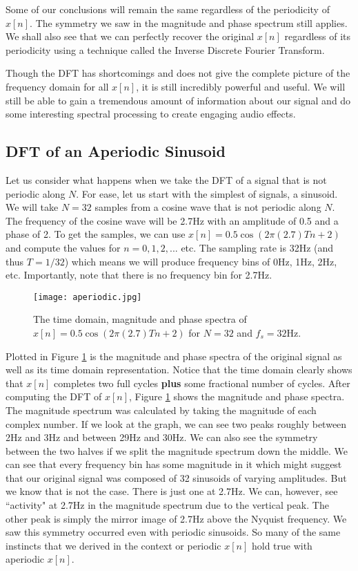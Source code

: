 Some of our conclusions will remain the same regardless of the periodicity of $x[n]$.  The symmetry we saw 
in the magnitude and phase spectrum still applies.  We shall also see that we can perfectly recover the 
original $x[n]$ regardless
of its periodicity using a technique called the Inverse Discrete Fourier Transform.

Though the DFT has shortcomings and does not give the complete picture of the frequency domain for
all $x[n]$, it is still incredibly powerful and useful.  We will still be able to gain a tremendous amount of
information about our signal and do some interesting spectral processing to create engaging audio effects.

\subsection*{DFT of an Aperiodic Sinusoid}

Let us consider what happens when we take the DFT of a signal that is not periodic along $N$.  For ease, let us
start with the simplest of signals, a sinusoid.  We will take $N = 32$ samples from a cosine wave 
that is not periodic along $N$.  The frequency of the cosine wave will be 2.7Hz with an amplitude of 0.5 and a phase of
2.  To get the samples, we can use $x[n] = 0.5\cos(2\pi (2.7)Tn + 2)$ and compute the values for 
$n = 0, 1, 2,...$ etc.
The sampling rate is 32Hz (and thus $T = 1/32$) 
which means we will produce frequency bins of 0Hz, 1Hz, 2Hz, etc.  Importantly, note that there is no frequency bin 
for 2.7Hz.  

\begin{figure}[h]
	\caption{The time domain, magnitude and phase spectra of $x[n] = 0.5\cos(2\pi (2.7)Tn + 2)$
	for $N = 32$ and $f_s = 32$Hz.}
	\label{fig:aperiodicGraph}
	\begin{center}
		\texttt{[image: aperiodic.jpg]}
	\end{center}
\end{figure}

Plotted in Figure \ref{fig:aperiodicGraph} is the magnitude and phase spectra of the original signal as well as its time 
domain representation.  Notice that the time domain clearly shows that $x[n]$ completes
two full cycles \textbf{plus} some fractional number of cycles.  After computing the DFT of $x[n]$, Figure 
\ref{fig:aperiodicGraph} shows the magnitude and phase spectra.
The magnitude spectrum was calculated by taking the magnitude of each complex number.  
If we look at the graph, we can see two peaks roughly between 2Hz and 3Hz
and between 29Hz and 30Hz.  We can also see the symmetry between the two halves if we split the magnitude spectrum
down the middle.  We can see that every frequency bin has some magnitude in it which might suggest that our original
signal was composed of 32 sinusoids of varying amplitudes.  But we know that is not the case.  There is just one at
2.7Hz.  We can, however, see ``activity" at 2.7Hz in the magnitude spectrum due to the vertical peak.  The other peak
is simply the mirror image of 2.7Hz above the Nyquist frequency.  We saw this symmetry occurred even with periodic
sinusoids.  So many of the same instincts that we derived in the context or periodic $x[n]$ hold true with aperiodic 
$x[n]$. 

